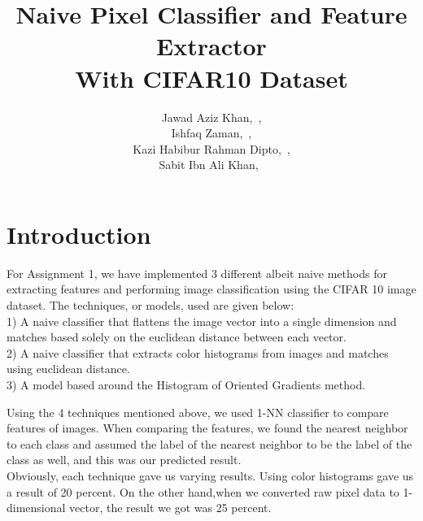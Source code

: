 \documentclass[]{IEEEphot}
\begin{document}
\title{Naive Pixel Classifier and Feature Extractor\\ With CIFAR10 Dataset}

\author{Jawad Aziz Khan,~, \\Ishfaq Zaman,~, \\ Kazi Habibur Rahman Dipto,~, \\Sabit Ibn Ali Khan,~}


\affil{}

\doiinfo{}%

\maketitle



\begin{receivedinfo}%

\end{receivedinfo}



\section{Introduction}

For Assignment 1, we have implemented 3 different albeit naive methods for extracting features and performing image classification using the CIFAR 10 image dataset. The techniques, or models, used are given below:
\\1) A naive classifier that flattens the image vector into a single dimension and matches based solely on the euclidean distance between each vector.
\\2) A naive classifier that extracts color histograms from images and matches using euclidean distance.
\\3) A model based around the Histogram of Oriented Gradients method.

Using the 4 techniques mentioned above, we used 1-NN classifier to compare features of images. When comparing the features, we found the nearest neighbor to each class and assumed the label of the nearest neighbor to be the label of the class as well, and this was our predicted result.\\Obviously, each technique gave us varying results. Using color histograms gave us a result of 20 percent. On the other hand,when we converted raw pixel data to 1-dimensional vector, the result we got was 25 percent. 
\end{document}
